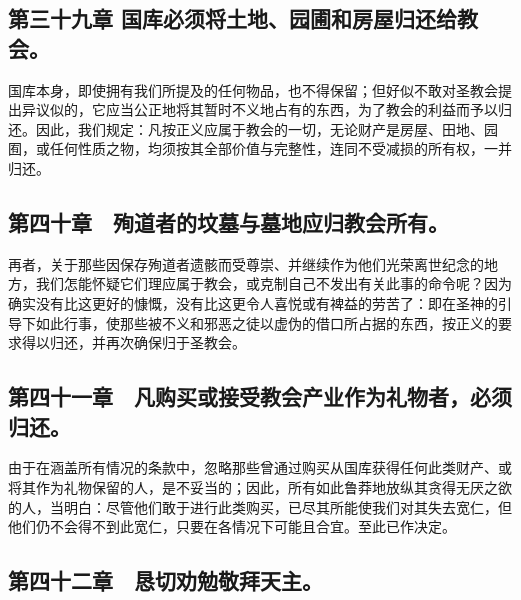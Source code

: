 
\subsection{第三十九章 国库必须将土地、园圃和房屋归还给教会。}

国库本身，即使拥有我们所提及的任何物品，也不得保留；但好似不敢对圣教会提出异议似的，它应当公正地将其暂时不义地占有的东西，为了教会的利益而予以归还。因此，我们规定：凡按正义应属于教会的一切，无论财产是房屋、田地、园囿，或任何性质之物，均须按其全部价值与完整性，连同不受减损的所有权，一并归还。\par


\subsection{第四十章　殉道者的坟墓与墓地应归教会所有。}

再者，关于那些因保存殉道者遗骸而受尊崇、并继续作为他们光荣离世纪念的地方，我们怎能怀疑它们理应属于教会，或克制自己不发出有关此事的命令呢？因为确实没有比这更好的慷慨，没有比这更令人喜悦或有裨益的劳苦了：即在圣神的引导下如此行事，使那些被不义和邪恶之徒以虚伪的借口所占据的东西，按正义的要求得以归还，并再次确保归于圣教会。\par


\subsection{第四十一章　凡购买或接受教会产业作为礼物者，必须归还。}

由于在涵盖所有情况的条款中，忽略那些曾通过购买从国库获得任何此类财产、或将其作为礼物保留的人，是不妥当的；因此，所有如此鲁莽地放纵其贪得无厌之欲的人，当明白：尽管他们敢于进行此类购买，已尽其所能使我们对其失去宽仁，但他们仍不会得不到此宽仁，只要在各情况下可能且合宜。至此已作决定。\par


\subsection{第四十二章　恳切劝勉敬拜天主。}

